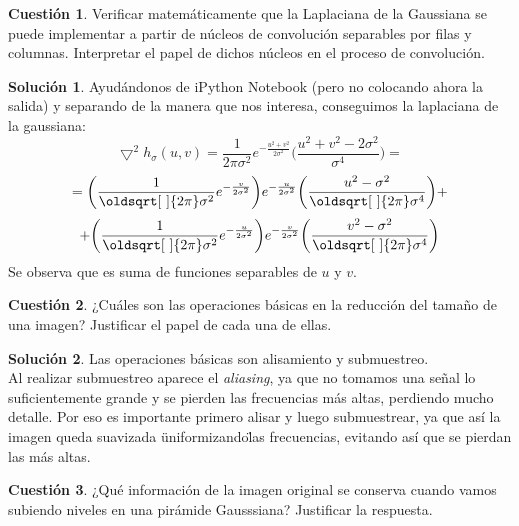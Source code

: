 \documentclass[a4paper, 11pt]{article}
\theoremstyle{definition}
\newtheorem{cuestion}{Cuestión}
\newtheorem*{solucion}{Solución}
\renewcommand*{\sqrt}[2][\ ]{\oldsqrt[#1]{#2} }
\begin{document}
  \begin{cuestion}
     	Verificar matemáticamente que la Laplaciana de la Gaussiana se puede implementar
       a partir de núcleos de convolución separables por filas y columnas.
       Interpretar el papel de dichos núcleos en el proceso de convolución.

  \end{cuestion}

  \begin{solucion}
    Ayudándonos de iPython Notebook (pero no colocando ahora la salida) y separando
    de la manera que nos interesa, conseguimos la laplaciana de la gaussiana:
    \[ \bigtriangledown^2h_\sigma(u,v) = \frac{1}{2\pi \sigma^2} e^{-\frac{u^2+v^2}{2\sigma^2}} \bigg( \frac{u^2+v^2-2\sigma^2}{\sigma^4} \bigg) =\]
    \[ = \bigg( \frac{1}{\sqrt{2\pi}\sigma^2} e^{-\frac{v}{2\sigma^2}} \bigg) e^{-\frac{u}{2\sigma^2}} \bigg( \frac{u^2-\sigma^2}{\sqrt{2\pi}\sigma^4} \bigg) + \]
    \[ + \bigg( \frac{1}{\sqrt{2\pi}\sigma^2} e^{-\frac{u}{2\sigma^2}} \bigg) e^{-\frac{v}{2\sigma^2}} \bigg( \frac{v^2-\sigma^2}{\sqrt{2\pi}\sigma^4} \bigg)\]
    Se observa que es suma de funciones separables de $u$ y $v$.
  \end{solucion}


  \begin{cuestion}
     	 ¿Cuáles son las operaciones básicas en la reducción del tamaño de una imagen? Justificar el papel de cada una de ellas.

  \end{cuestion}

  \begin{solucion}
     	Las operaciones básicas son alisamiento y submuestreo.\\

      Al realizar submuestreo aparece el \textit{aliasing}, ya que no tomamos una
      señal lo suficientemente grande y se pierden las frecuencias más altas,
      perdiendo mucho detalle. Por eso es importante primero alisar y luego submuestrear,
      ya que así la imagen queda suavizada \"uniformizando\" las frecuencias, evitando
      así que se pierdan las más altas.
  \end{solucion}
  \begin{cuestion}
     	¿Qué información de la imagen original se conserva cuando vamos
      subiendo niveles en una pirámide Gausssiana? Justificar la respuesta.

  \end{cuestion}
\end{document}
